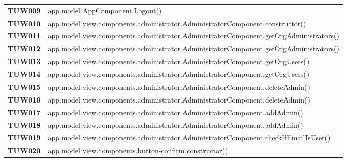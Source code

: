 \documentclass[../../piano-di-qualifica.tex]{subfiles}
\begin{document}
\begin{longtable}[H]{>{\centering\bfseries}m{3cm} >{}m{13cm}}
  TUW009             & app.model.AppComponent.Logout\@()                                                                       \\


  TUW010             & app.model.view.components.administrator.AdministratorComponent.constructor\@()                          \\

  TUW011             & app.model.view.components.administrator.AdministratorComponent.getOrgAdministrators\@()                 \\

  TUW012             & app.model.view.components.administrator.AdministratorComponent.getOrgAdministrators\@()                 \\

  TUW013             & app.model.view.components.administrator.AdministratorComponent.getOrgUsers\@()                          \\

  TUW014             & app.model.view.components.administrator.AdministratorComponent.getOrgUsers\@()                          \\

  TUW015             & app.model.view.components.administrator.AdministratorComponent.deleteAdmin\@()                          \\

  TUW016             & app.model.view.components.administrator.AdministratorComponent.deleteAdmin\@()                          \\

  TUW017             & app.model.view.components.administrator.AdministratorComponent.addAdmin\@()                             \\

  TUW018             & app.model.view.components.administrator.AdministratorComponent.addAdmin\@()                             \\

  TUW019             & app.model.view.components.administrator.AdministratorComponent.checkIfEmailIsUser\@()                   \\


  TUW020             & app.model.view.components.button-confirm.constructor\@()                                                \\


\end{longtable}
\end{document}
